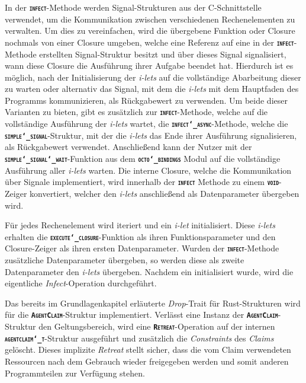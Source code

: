 In der \texttt{\textsc{\textbf{infect}}}-Methode werden Signal-Strukturen aus der C-Schnittstelle verwendet,
um die Kommunikation zwischen verschiedenen Rechenelementen zu verwalten.
Um dies zu vereinfachen, wird die übergebene Funktion oder Closure nochmals von einer Closure umgeben,
welche eine Referenz auf eine in der \texttt{\textsc{\textbf{infect}}}-Methode erstellten Signal-Struktur besitzt
und über dieses Signal signalisiert, wann diese Closure die Ausführung ihrer Aufgabe beendet hat.
Hierdurch ist es möglich, nach der Initialisierung der \textit{i-lets} auf die
vollständige Abarbeitung dieser zu warten oder alternativ das Signal, mit dem die \textit{i-lets} mit dem
Hauptfaden des Programms kommunizieren, als Rückgabewert zu verwenden.
Um beide dieser Varianten zu bieten, gibt es zusätzlich zur \texttt{\textsc{\textbf{infect}}}-Methode,
welche auf die vollständige Ausführung der \textit{i-lets} wartet,
die \texttt{\textsc{\textbf{infect\char`_async}}}-Methode,
welche die \texttt{\textsc{\textbf{simple\char`_signal}}}-Struktur,
mit der die \textit{i-lets} das Ende ihrer Ausführung signalisieren,
als Rückgabewert verwendet. Anschließend kann der Nutzer mit der 
\texttt{\textsc{\textbf{simple\char`_signal\char`_wait}}}-Funktion aus dem
\texttt{\textsc{\textbf{octo\char`_bindings}}}
Modul auf die vollständige Ausführung aller \textit{i-lets} warten.
Die interne Closure, welche die Kommunikation über Signale implementiert, wird innerhalb der
\texttt{\textsc{\textbf{infect}}} Methode zu einem \texttt{\textsc{\textbf{void}}}-Zeiger konvertiert,
welcher den \textit{i-lets} anschließend als Datenparameter übergeben wird.

Für jedes Rechenelement wird iteriert und ein \textit{i-let} initialisiert.
Diese \textit{i-lets} erhalten die \texttt{\textsc{\textbf{execute\char`_closure}}}-Funktion als ihren
Funktionsparameter und den Closure-Zeiger als ihren ersten Datenparameter.
Wurden der \texttt{\textsc{\textbf{infect}}}-Methode zusätzliche Datenparameter
übergeben, so werden diese als zweite Datenparameter den \textit{i-lets} übergeben.
Nachdem ein  initialisiert wurde, wird die eigentliche \textit{Infect}-Operation durchgeführt.

Das bereits im Grundlagenkapitel erläuterte \textit{Drop}-Trait für Rust-Strukturen wird für die
\texttt{\textsc{\textbf{AgentClaim}}}-Struktur implementiert.
Verlässt eine Instanz der \texttt{\textsc{\textbf{AgentClaim}}}-Struktur den Geltungsbereich,
wird eine \texttt{\textsc{\textbf{Retreat}}}-Operation auf der
internen \texttt{\textsc{\textbf{agentclaim\char`_t}}}-Struktur ausgeführt und zusätzlich
die \textit{Constraints} des \textit{Claims} gelöscht. Dieses implizite \textit{Retreat}
stellt sicher, dass die vom Claim verwendeten Ressourcen nach dem Gebrauch wieder freigegeben werden und
somit anderen Programmteilen zur Verfügung stehen.
